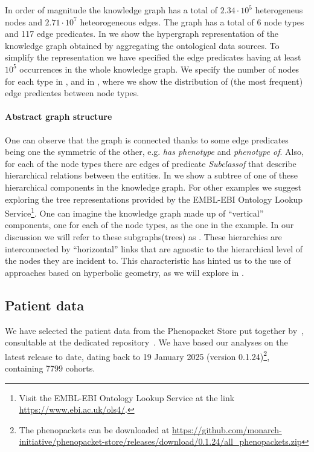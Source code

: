 In order of magnitude the knowledge graph has a total of $2.34\cdot10^5$ heterogeneus nodes and $2.71\cdot10^7$ heteorogeneous edges. The graph has a total of 6 node types and 117 edge predicates. In  we show the hypergraph representation of the knowledge graph obtained by aggregating the ontological data sources. To simplify the representation we have specified the edge predicates having at least $10^5$ occurrences in the whole knowledge graph. We specify the number of nodes for each type in , and in , where we show the distribution of (the most frequent) edge predicates between node types.

\paragraph{Abstract graph structure}\label{sec:abstractGraphStructure}
One can observe that the graph is connected thanks to some edge predicates being one the symmetric of the other, e.g. \emph{has phenotype} and \emph{phenotype of}. Also, for each of the node types there are edges of predicate \emph{Subclassof} that describe hierarchical relations between the entities. In  we show a subtree of one of these hierarchical components in the knowledge graph. For other examples we suggest exploring the tree representations provided by the EMBL-EBI Ontology Lookup Service\footnote{Visit the EMBL-EBI Ontology Lookup Service at the link \url{https://www.ebi.ac.uk/ols4/}.}. One can imagine the knowledge graph made up of ``vertical'' components, one for each of the node types, as the one in the example. In our discussion we will refer to these subgraphs(trees) as . These hierarchies are interconnected by ``horizontal'' links that are agnostic to the hierarchical level of the nodes they are incident to. This characteristic has hinted us to the use of approaches based on hyperbolic geometry, as we will explore in .

\subsection{Patient data}
We have selected the patient data from the Phenopacket Store put together by~\cite{Danis2025Phenopackets}, consultable at the dedicated repository~\cite{Robinson2024PhenopacketStore}. We have based our analyses on the latest release to date, dating back to 19 January 2025 (version 0.1.24)\footnote{The phenopackets can be downloaded at \url{https://github.com/monarch-initiative/phenopacket-store/releases/download/0.1.24/all_phenopackets.zip}}, containing 7799 cohorts. 

